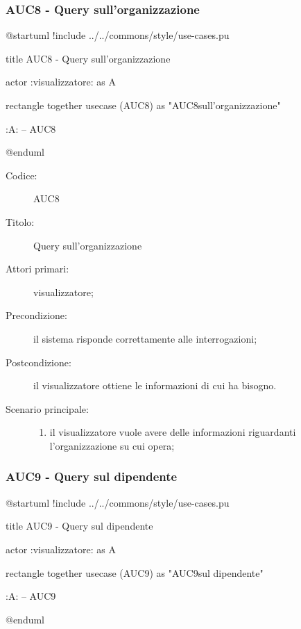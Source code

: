 \documentclass[casi-duso]{subfiles}
\begin{document}
\subsubsection{AUC8 - Query sull'organizzazione}%
\label{subsub:AUC8}

\begin{plantuml}
@startuml
!include ../../commons/style/use-cases.pu

title AUC8 - Query sull'organizzazione

actor :visualizzatore: as A

rectangle {
  together {
    usecase (AUC8) as "AUC8\nQuery sull'organizzazione"
  }
}

:A: -- AUC8

@enduml
\end{plantuml}

\begin{description}
  \item[Codice:] AUC8
  \item[Titolo:] Query sull'organizzazione
  \item[Attori primari:] visualizzatore;
  \item[Precondizione:] il sistema risponde correttamente alle interrogazioni;
  \item[Postcondizione:] il visualizzatore ottiene le informazioni di cui ha bisogno.
  \item[Scenario principale:]
  \begin{enumerate}
    \item il visualizzatore vuole avere delle informazioni riguardanti l'organizzazione su cui opera;
  \end{enumerate}
\end{description}

\subsubsection{AUC9 - Query sul dipendente}%
\label{subsub:AUC9}

\begin{plantuml}
@startuml
!include ../../commons/style/use-cases.pu

title AUC9 - Query sul dipendente

actor :visualizzatore: as A

rectangle {
  together {
    usecase (AUC9) as "AUC9\nQuery sul dipendente"
  }
}

:A: -- AUC9

@enduml
\end{plantuml}
\end{document}
